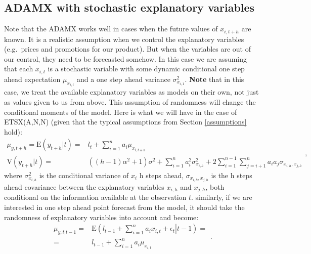 \documentclass[
]{book}
\theoremstyle{definition}
\theoremstyle{definition}
\theoremstyle{definition}
\theoremstyle{definition}
\theoremstyle{remark}
\begin{document}
\hypertarget{ADAMXConventionalConditionalMomentsRandom}{%
\subsection{ADAMX with stochastic explanatory variables}\label{ADAMXConventionalConditionalMomentsRandom}}

Note that the ADAMX works well in cases when the future values of \(x_{i,t+h}\) are known. It is a realistic assumption when we control the explanatory variables (e.g.~prices and promotions for our product). But when the variables are out of our control, they need to be forecasted somehow. In this case we are assuming that each \(x_{i,t}\) is a stochastic variable with some dynamic conditional one step ahead expectation \(\mu_{x_{i,t}}\) and a one step ahead variance \(\sigma^2_{x_{i,1}}\). \textbf{Note} that in this case, we treat the available explanatory variables as models on their own, not just as values given to us from above. This assumption of randomness will change the conditional moments of the model. Here is what we will have in the case of ETSX(A,N,N) (given that the typical assumptions from Section \ref{assumptions} hold):
\begin{equation}
  \begin{aligned}
    \mu_{y,t+h} = \text{E}(y_{t+h}|t) = & l_{t} + \sum_{i=1}^n a_i \mu_{x_{i,t+h}} \\
    \text{V}(y_{t+h}|t) = & \left((h-1) \alpha^2 + 1 \right) \sigma^2 + \sum_{i=1}^n a^2_i \sigma^2_{x_{i,h}} + 2 \sum_{i=1}^{n-1} \sum_{j=i+1}^n a_i a_j \sigma_{x_{i,h},x_{j,h}}
  \end{aligned},
  \label{eq:ETSXADAMStateSpaceANNRecursionMeanAndVarianceRandomness}
\end{equation}
where \(\sigma^2_{x_{i,h}}\) is the conditional variance of \(x_{i}\) h steps ahead, \(\sigma_{x_{i,h},x_{j,h}}\) is the h steps ahead covariance between the explanatory variables \(x_{i,h}\) and \(x_{j,h}\), both conditional on the information available at the observation \(t\). similarly, if we are interested in one step ahead point forecast from the model, it should take the randomness of explanatory variables into account and become:
\begin{equation}
  \begin{aligned}
    \mu_{y,t |t-1} = &  \left. \mathrm{E}\left(l_{t-1} + \sum_{i=1}^n a_i x_{i,t} + \epsilon_{t} \right| t-1 \right) = \\
                = & l_{t-1} + \sum_{i=1}^n a_i \mu_{x_{i,t}}
  \end{aligned}.
  \label{eq:ADAMETSXANNStepAhead}
\end{equation}
\end{document}
